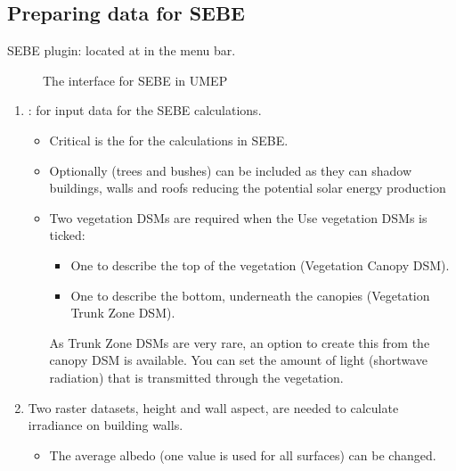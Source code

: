 \documentclass[letterpaper,10pt,english]{sphinxmanual}
\let\sphinxpxdimen\pdfpxdimen\else\newdimen\sphinxpxdimen
\begin{document}
\subsection{Preparing data for SEBE}
\label{\detokenize{Tutorials/SEBE:preparing-data-for-sebe}}
SEBE plugin: located at  in the menu bar.

\begin{figure}[htbp]
\centering
\capstart

\noindent\sphinxincludegraphics[width=514\sphinxpxdimen]{{SEBE_SEBE1}.png}
\caption{The interface for SEBE in UMEP}\label{\detokenize{Tutorials/SEBE:id4}}\end{figure}
\begin{enumerate}
\item {} 
: for input data for the SEBE calculations.
\begin{itemize}
\item {} 
Critical is the 
{\hyperref[\detokenize{Abbreviations:abbreviations}]{}}
for the calculations in SEBE.

\item {} 
Optionally  (trees and bushes) can be included as
they can shadow buildings, walls and roofs reducing the potential
solar energy production

\item {} 
Two vegetation DSMs are required when the Use vegetation DSMs is
ticked:
\begin{itemize}
\item {} 
One to describe the top of the vegetation (Vegetation Canopy DSM).

\item {} 
One to describe the bottom, underneath the canopies (Vegetation Trunk Zone DSM).

\end{itemize}

As Trunk Zone DSMs are very rare, an option to create this from the
canopy DSM is available. You can set the amount of light (shortwave radiation) that is
transmitted through the vegetation.

\end{itemize}

\item {} 
Two raster datasets, height and wall aspect, are needed to calculate
irradiance on building walls.
\begin{itemize}
\item {} 
The average albedo (one value is used for all surfaces) can be
changed.


\end{itemize}
\end{enumerate}
\end{document}
